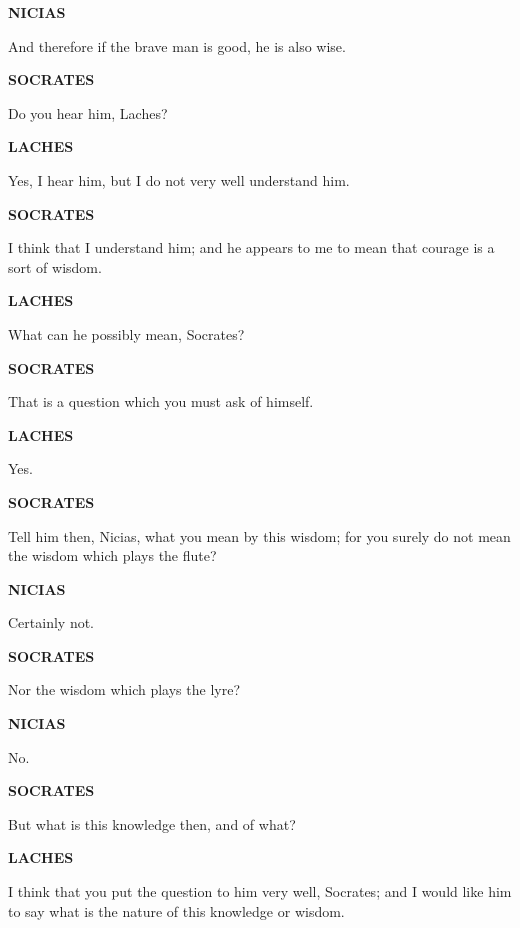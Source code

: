 \documentclass[11pt,letter]{book}
\begin{document}
\par \textbf{NICIAS}
\par   And therefore if the brave man is good, he is also wise.

\par \textbf{SOCRATES}
\par   Do you hear him, Laches?

\par \textbf{LACHES}
\par   Yes, I hear him, but I do not very well understand him.

\par \textbf{SOCRATES}
\par   I think that I understand him; and he appears to me to mean that courage is a sort of wisdom.

\par \textbf{LACHES}
\par   What can he possibly mean, Socrates?

\par \textbf{SOCRATES}
\par   That is a question which you must ask of himself.

\par \textbf{LACHES}
\par   Yes.

\par \textbf{SOCRATES}
\par   Tell him then, Nicias, what you mean by this wisdom; for you surely do not mean the wisdom which plays the flute?

\par \textbf{NICIAS}
\par   Certainly not.

\par \textbf{SOCRATES}
\par   Nor the wisdom which plays the lyre?

\par \textbf{NICIAS}
\par   No.

\par \textbf{SOCRATES}
\par   But what is this knowledge then, and of what?

\par \textbf{LACHES}
\par   I think that you put the question to him very well, Socrates; and I would like him to say what is the nature of this knowledge or wisdom.
\end{document}
